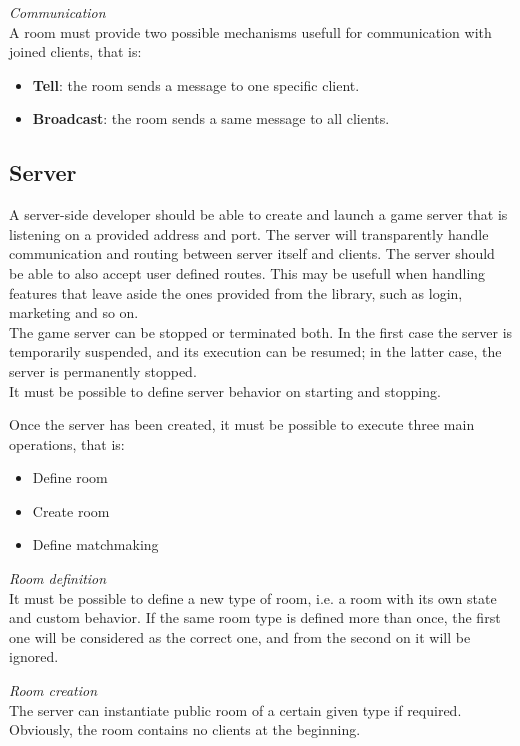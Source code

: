 \bigskip
\textit{Communication}
\\
A room must provide two possible mechanisms usefull for communication with joined clients, that is:
\begin{itemize}
\item \textbf{Tell}: the room sends a message to one specific client.
\item \textbf{Broadcast}: the room sends a same message to all clients. 
\end{itemize} 


\subsection{Server}

A server-side developer should be able to create and launch a game server that is listening on a provided address and port. The server will transparently handle communication and routing between server itself and clients. The server should be able to also accept user defined routes. This may be usefull when handling features that leave aside the ones provided from the library, such as login, marketing and so on.
\\
The game server can be stopped or terminated both. In the first case the server is temporarily suspended, and its execution can be resumed; in the latter case, the server is permanently stopped.
\\
It must be possible to define server behavior on starting and stopping.

\bigskip
Once the server has been created, it must be possible to execute three main operations, that is:
\begin{itemize}
\item Define room
\item Create room
\item Define matchmaking 
\end{itemize}

\bigskip
\textit{Room definition}
\\
It must be possible to define a new type of room, i.e. a room with its own state and custom behavior.
If the same room type is defined more than once, the first one will be considered as the correct one, and from the second on it will be ignored.

\bigskip
\textit{Room creation}
\\
The server can instantiate public room of a certain given type if required. Obviously, the room contains no clients at the beginning.

